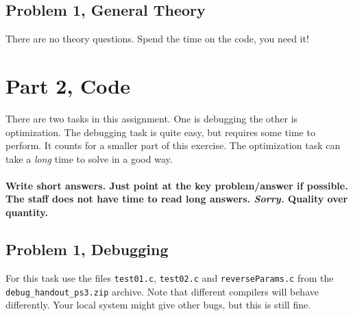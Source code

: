 \documentclass[10pt,a4paper]{article}
\begin{document}
\subsection*{Problem 1, General Theory}
There are no theory questions. Spend the time on the code, you need it!



\section*{Part 2, Code}
There are two tasks in this assignment. One is debugging the other is optimization. The debugging task is quite easy, but requires some time to perform. It counts for a smaller part of this exercise. The optimization task can take a \emph{long} time to solve in a good way.
\\
\\
\textbf{ Write short answers. Just point at the key problem/answer if possible. The staff does not have time to read long answers. \emph{Sorry.} Quality over quantity.}


\subsection*{Problem 1, Debugging}
For this task use the files \texttt{test01.c}, \texttt{test02.c} and \texttt{reverseParams.c} from the \texttt{debug\_handout\_ps3.zip} archive. 
Note that different compilers will behave differently. Your local system might give other bugs, but this is still fine.
\end{document}
